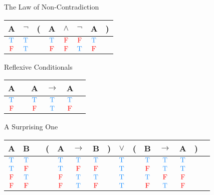 \documentclass[
  ignorenonframetext,
]{beamer}
\renewcommand{\,}{\text{, }}
\def\True{\textcolor{dodgerblue}{\text{T}}}
\def\False{\textcolor{red}{\text{F}}}
\begin{document}
\begin{frame}{The Law of Non-Contradiction}
\protect\hypertarget{the-law-of-non-contradiction}{}

\begin{center}
\begin{tabular}{@{ }c | c@{ }@{}c@{}@{ }c@{ }@{ }c@{ }@{ }c@{ }@{ }c@{ }@{}c@{ }}
A & $\neg$ & ( & A & $\wedge$ & $\neg$ & A & )\\
\hline 
$\True$ & \textcolor{red}{$\True$} &  & $\True$ & $\False$ & $\False$ & $\True$ & \\
$\False$ & \textcolor{red}{$\True$} &  & $\False$ & $\False$ & $\True$ & $\False$ & \\
\end{tabular}
\end{center}

\end{frame}

\begin{frame}{Reflexive Conditionals}
\protect\hypertarget{reflexive-conditionals}{}

\begin{center}
\begin{tabular}{@{ }c | c@{ }@{ }c@{ }@{ }c@{ }@{ }c@{ }@{ }c}
A &  & A & $\rightarrow$ & A & \\
\hline 
$\True$ &  & $\True$ & \textcolor{red}{$\True$} & $\True$ & \\
$\False$ &  & $\False$ & \textcolor{red}{$\True$} & $\False$ & \\
\end{tabular}
\end{center}

\end{frame}

\begin{frame}{A Surprising One}
\protect\hypertarget{a-surprising-one}{}

\begin{center}
\begin{tabular}{@{ }c@{ }@{ }c | c@{ }@{}c@{}@{ }c@{ }@{ }c@{ }@{ }c@{ }@{}c@{}@{ }c@{ }@{}c@{}@{ }c@{ }@{ }c@{ }@{ }c@{ }@{}c@{}@{ }c}
A & B &  & ( & A & $\rightarrow$ & B & ) & $\lor$ & ( & B & $\rightarrow$ & A & ) & \\
\hline 
$\True$ & $\True$ &  &  & $\True$ & $\True$ & $\True$ &  & \textcolor{red}{$\True$} &  & $\True$ & $\True$ & $\True$ &  & \\
$\True$ & $\False$ &  &  & $\True$ & $\False$ & $\False$ &  & \textcolor{red}{$\True$} &  & $\False$ & $\True$ & $\True$ &  & \\
$\False$ & $\True$ &  &  & $\False$ & $\True$ & $\True$ &  & \textcolor{red}{$\True$} &  & $\True$ & $\False$ & $\False$ &  & \\
$\False$ & $\False$ &  &  & $\False$ & $\True$ & $\False$ &  & \textcolor{red}{$\True$} &  & $\False$ & $\True$ & $\False$ &  & \\
\end{tabular}
\end{center}

\end{frame}
\end{document}
